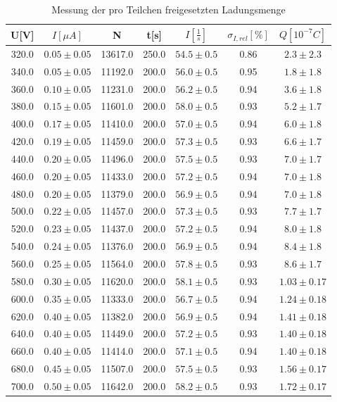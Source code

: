 \documentclass[11pt,ngerman,a4paper]{article}
\begin{document}
\begin{table}[H]
\centering
\begin{tabular}{ccccccc}
\toprule
{U[V]} &{$ I[\mu A]$} &{ N} &{ t[s]} &{ $I\left[\frac{1}{s}\right]$} & $\sigma_{I,rel} [\%]$ &$ Q[10^{-7}C]$ \\
\midrule
320.0 & $0.05\pm0.05$ & 13617.0 & 250.0 & $54.5\pm0.5$ & 0.86 & $2.3\pm2.3$\\
340.0 & $0.05\pm0.05$ & 11192.0 & 200.0 & $56.0\pm0.5$ & 0.95 & $1.8\pm1.8$\\
360.0 & $0.10\pm0.05$ & 11231.0 & 200.0 & $56.2\pm0.5$ & 0.94 & $3.6\pm1.8$\\
380.0 & $0.15\pm0.05$ & 11601.0 & 200.0 & $58.0\pm0.5$ & 0.93 & $5.2\pm1.7$\\
400.0 & $0.17\pm0.05$ & 11410.0 & 200.0 & $57.0\pm0.5$ & 0.94 & $6.0\pm1.8$\\
420.0 & $0.19\pm0.05$ & 11459.0 & 200.0 & $57.3\pm0.5$ & 0.93 & $6.6\pm1.7$\\
440.0 & $0.20\pm0.05$ & 11496.0 & 200.0 & $57.5\pm0.5$ & 0.93 & $7.0\pm1.7$\\
460.0 & $0.20\pm0.05$ & 11433.0 & 200.0 & $57.2\pm0.5$ & 0.94 & $7.0\pm1.8$\\
480.0 & $0.20\pm0.05$ & 11379.0 & 200.0 & $56.9\pm0.5$ & 0.94 & $7.0\pm1.8$\\
500.0 & $0.22\pm0.05$ & 11457.0 & 200.0 & $57.3\pm0.5$ & 0.93 & $7.7\pm1.7$\\
520.0 & $0.23\pm0.05$ & 11437.0 & 200.0 & $57.2\pm0.5$ & 0.94 & $8.0\pm1.8$\\
540.0 & $0.24\pm0.05$ & 11376.0 & 200.0 & $56.9\pm0.5$ & 0.94 & $8.4\pm1.8$\\
560.0 & $0.25\pm0.05$ & 11564.0 & 200.0 & $57.8\pm0.5$ & 0.93 & $8.6\pm1.7$\\
580.0 & $0.30\pm0.05$ & 11620.0 & 200.0 & $58.1\pm0.5$ & 0.93 & $1.03\pm0.17$\\
600.0 & $0.35\pm0.05$ & 11333.0 & 200.0 & $56.7\pm0.5$ & 0.94 & $1.24\pm0.18$\\
620.0 & $0.40\pm0.05$ & 11382.0 & 200.0 & $56.9\pm0.5$ & 0.94 & $1.41\pm0.18$\\
640.0 & $0.40\pm0.05$ & 11449.0 & 200.0 & $57.2\pm0.5$ & 0.93 & $1.40\pm0.18$\\
660.0 & $0.40\pm0.05$ & 11414.0 & 200.0 & $57.1\pm0.5$ & 0.94 & $1.40\pm0.18$\\
680.0 & $0.45\pm0.05$ & 11507.0 & 200.0 & $57.5\pm0.5$ & 0.93 & $1.56\pm0.17$\\
700.0 & $0.50\pm0.05$ & 11642.0 & 200.0 & $58.2\pm0.5$ & 0.93 & $1.72\pm0.17$\\
\bottomrule
\end{tabular}
\label{tab3}
\caption{Messung der pro Teilchen freigesetzten Ladungsmenge}
\end{table}
\end{document}
